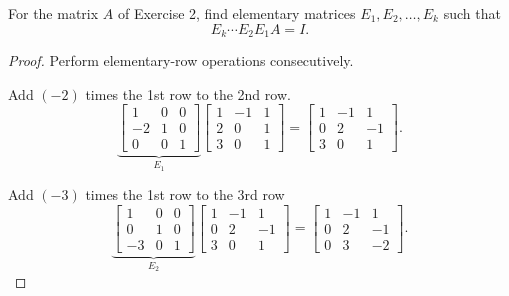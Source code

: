 \begin{exercise}
    For the matrix $A$ of Exercise 2, find elementary matrices $E_{1}, E_{2}, \ldots, E_{k}$ such that
    \[
        E_{k}\cdots E_{2}E_{1}A = I.
    \]
\end{exercise}

\begin{proof}
    Perform elementary-row operations consecutively.

    Add $(-2)$ times the 1st row to the 2nd row.
    \[
        \underbrace{\begin{bmatrix}
                1  & 0 & 0 \\
                -2 & 1 & 0 \\
                0  & 0 & 1
            \end{bmatrix}}_{E_{1}}
        \begin{bmatrix}
            1 & -1 & 1 \\
            2 & 0  & 1 \\
            3 & 0  & 1
        \end{bmatrix}
        =
        \begin{bmatrix}
            1 & -1 & 1  \\
            0 & 2  & -1 \\
            3 & 0  & 1
        \end{bmatrix}.
    \]

    Add $(-3)$ times the 1st row to the 3rd row
    \[
        \underbrace{\begin{bmatrix}
                1  & 0 & 0 \\
                0  & 1 & 0 \\
                -3 & 0 & 1
            \end{bmatrix}}_{E_{2}}
        \begin{bmatrix}
            1 & -1 & 1  \\
            0 & 2  & -1 \\
            3 & 0  & 1
        \end{bmatrix}
        =
        \begin{bmatrix}
            1 & -1 & 1  \\
            0 & 2  & -1 \\
            0 & 3  & -2
        \end{bmatrix}.
    \]


\end{proof}
